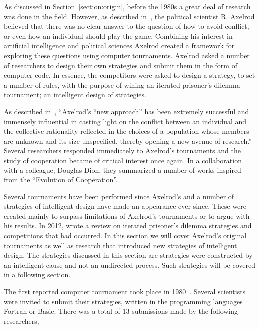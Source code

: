 \documentclass{article}
\theoremstyle{definition}
\begin{document}
As discussed in Section~\ref{section:origin}, before the 1980s a great deal of
research was done in the field. However, as described in~\cite{Axelrod2012}, the
political scientist R. Axelrod believed that there was no clear answer to the question
of how to avoid conflict, or even how an individual should play the game. Combining
his interest in artificial intelligence and political sciences Axelrod created a
framework for exploring these questions using computer tournaments.
Axelrod asked a number of researchers to design their own strategies and submit them
in the form of computer code. In essence, the competitors were asked to design a
strategy, to set a number of rules, with the purpose of wining an iterated prisoner's
dilemma tournament; an intelligent design of strategies.

As described in~\cite{Rapoport2015}, ``Axelrod's “new approach” has been extremely
successful and immensely influential in casting light on the conflict between an
individual and the collective rationality reflected in the choices of a population
whose members are unknown and its size unspecified, thereby opening a new avenue
of research.'' Several researchers responded immediately to Axelrod’s
tournaments and the study of cooperation became of critical interest once again.
In a collaboration~\cite{Axelrod1988} with a colleague, Douglas Dion,
they summarized a number of works inspired from the ``Evolution of Cooperation''.

Several tournaments have been performed since Axelrod's and a number of strategies
of intelligent design have made an appearance ever since. These were created mainly
to surpass limitations of Axelrod's tournaments or to argue with his results.
In 2012, \cite{Jurisic2012} wrote a review on iterated prisoner's dilemma strategies and
competitions that had occurred.
In this section we will cover Axelrod's original tournaments as well as 
research that introduced new strategies of intelligent design. The strategies discussed in
this section are strategies were constructed by an intelligent cause and not an
undirected process. Such strategies will be covered in a following
section.

The first reported computer tournament took place in 1980~\cite{Axelrod1980a}.
Several scientists were invited to submit their strategies, written in the
programming languages Fortran or Basic. There was a total of 13 submissions
made by the following researchers,
\end{document}
